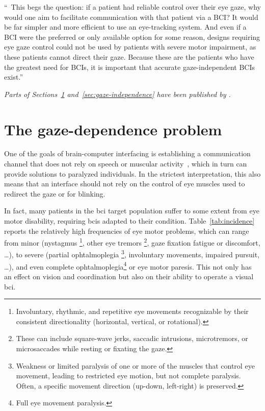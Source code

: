 \epigraph{%
  ``\elide\ This begs the question: if a patient had reliable control
  over their eye gaze, why would one aim to facilitate communication with that
  patient via a BCI? It would be far simpler and more efficient to use an
  eye-tracking system.
  And even if a BCI were the preferred or only available option for some reason,
  designs requiring eye gaze control could not be used
  by patients with severe motor impairment, as these patients
  cannot direct their gaze.
  Because these are the patients who have the greatest need for BCIs, it is
  important that accurate gaze-independent BCIs exist.''
}{%
  \textcite{Egan2017}
}

\emph{Parts of Sections~\ref{sec:gaze-dependence} and~\ref{sec:gaze-independence}
have been published by \textcite{VanDenKerchove2024}.}


\section{The gaze-dependence problem}%
\label{sec:gaze-dependence}


One of the goals of brain-computer interfacing is establishing a communication
channel that does not rely on speech or muscular activity~\cite{Naci2012,Chaudhary2016},
which in turn can provide solutions to paralyzed individuals.
In the strictest interpretation, this also means that an interface should not
rely on the control of eye muscles used to redirect the gaze or for blinking.

In fact, many patients in the \ac{bci} target population suffer to some extent
from eye motor disability, requiring \ac{bci}s adapted to their condition.
Table~\ref{tab:incidence} reports the relatively high frequencies of
eye motor problems, which can range from minor (nystagmus
\footnote{%
Involuntary, rhythmic, and repetitive eye movements recognizable by their
consistent directionality (horizontal, vertical, or rotational).
}, other eye tremors
\footnote{%
These can include square-wave jerks, saccadic intrusions, microtremors, or
microsaccades while resting or fixating the gaze.
}, gaze fixation fatigue or discomfort, \ldots), to severe (partial ophtalmoplegia
\footnote{%
Weakness or limited paralysis of one or more of the muscles that control eye
movement, leading to restricted eye motion, but not complete paralysis.
Often, a specific movement direction (up-down, left-right) is preserved.
}, involuntary movements, impaired pursuit, \ldots), and even complete
ophtalmoplegia\footnote{Full eye movement paralysis.} or eye motor paresis.
This not only has an effect on vision and coordination but also
on their ability to operate a visual \ac{bci}.

